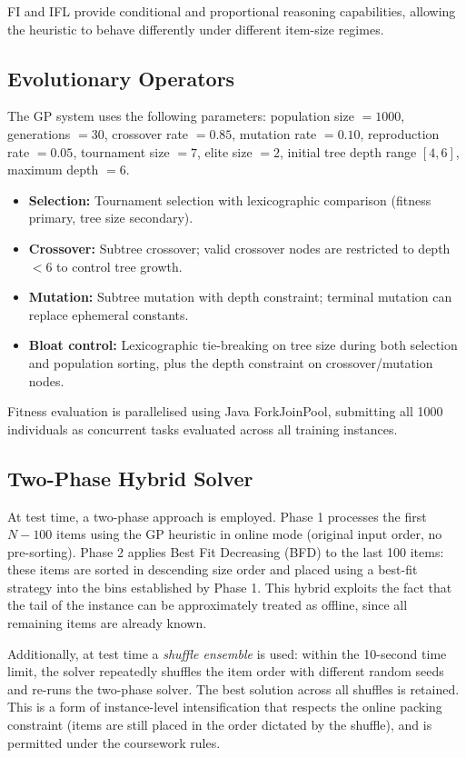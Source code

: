 \documentclass[conference]{IEEEtran}
\begin{document}
FI and IFL provide conditional and proportional reasoning capabilities, allowing the heuristic to behave differently under different item-size regimes.

\subsection{Evolutionary Operators}

The GP system uses the following parameters: population size $= 1000$, generations $= 30$, crossover rate $= 0.85$, mutation rate $= 0.10$, reproduction rate $= 0.05$, tournament size $= 7$, elite size $= 2$, initial tree depth range $[4, 6]$, maximum depth $= 6$.

\begin{itemize}
\item \textbf{Selection:} Tournament selection with lexicographic comparison (fitness primary, tree size secondary).
\item \textbf{Crossover:} Subtree crossover; valid crossover nodes are restricted to depth $< 6$ to control tree growth.
\item \textbf{Mutation:} Subtree mutation with depth constraint; terminal mutation can replace ephemeral constants.
\item \textbf{Bloat control:} Lexicographic tie-breaking on tree size during both selection and population sorting, plus the depth constraint on crossover/mutation nodes.
\end{itemize}

Fitness evaluation is parallelised using Java ForkJoinPool, submitting all 1000 individuals as concurrent tasks evaluated across all training instances.

\subsection{Two-Phase Hybrid Solver}

At test time, a two-phase approach is employed. Phase 1 processes the first $N - 100$ items using the GP heuristic in online mode (original input order, no pre-sorting). Phase 2 applies Best Fit Decreasing (BFD) to the last 100 items: these items are sorted in descending size order and placed using a best-fit strategy into the bins established by Phase 1. This hybrid exploits the fact that the tail of the instance can be approximately treated as offline, since all remaining items are already known.

Additionally, at test time a \emph{shuffle ensemble} is used: within the 10-second time limit, the solver repeatedly shuffles the item order with different random seeds and re-runs the two-phase solver. The best solution across all shuffles is retained. This is a form of instance-level intensification that respects the online packing constraint (items are still placed in the order dictated by the shuffle), and is permitted under the coursework rules.
\end{document}
